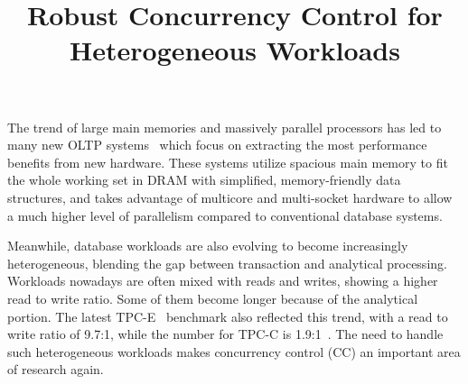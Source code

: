 \documentclass[preprint]{sig-alternate-nocprt}
\begin{document}

\title{Robust Concurrency Control for Heterogeneous Workloads}

\author{
\alignauthor
}

\maketitle

The trend of large main memories and massively parallel processors has led to many new OLTP systems~\cite{HStore,Hyper,Hekaton,Silo} which focus on extracting the most performance benefits from new hardware. These systems utilize spacious main memory to fit the whole working set in DRAM with simplified, memory-friendly data structures, and takes advantage of multicore and multi-socket hardware to allow a much higher level of parallelism compared to conventional database systems.

Meanwhile, database workloads are also evolving to become increasingly heterogeneous, blending the gap between transaction and analytical processing. Workloads nowadays are often mixed with reads and writes, showing a higher read to write ratio. Some of them become longer because of the analytical portion. The latest TPC-E~\cite{TPC-E} benchmark also reflected this trend, with a read to write ratio of 9.7:1, while the number for TPC-C is 1.9:1~\cite{TPC-Compare}. The need to handle such heterogeneous workloads makes concurrency control (CC) an important area of research again.
\end{document}
